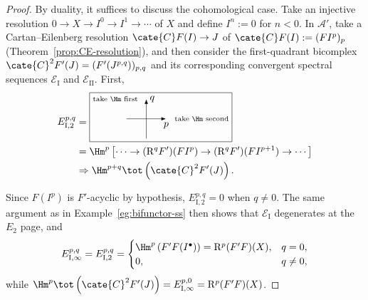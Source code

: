 \begin{proof}
	By duality, it suffices to discuss the cohomological case. Take an injective
	resolution $0\to X\to I^0\to I^1\to\cdots$ of $X$ and define $I^n:=0$ for
	$n<0$. In $\mathcal{A}'$, take a Cartan--Eilenberg resolution
	$\cate{C}F(I)\to J$ of $\cate{C}F(I):=(FI^p)_p$
	(Theorem~\ref{prop:CE-resolution}), and then consider the first-quadrant
	bicomplex $\cate{C}^2F'(J)=(F'(J^{p,q}))_{p,q}$ and its corresponding
	convergent spectral sequences $\mathscr{E}_{\mathrm{I}}$ and
	$\mathscr{E}_{\mathrm{II}}$. First,
	\begin{align*}
		E_{\mathrm{I},2}^{p, q} & =
		\begin{tikzpicture}[scale=0.7, baseline=(O)]
			\draw[-Latex] (0, -1) -- (0, 1) node[right] {$q$} node[left=0.5em] {\scriptsize\text{take $\Hm$ first}};
			\draw[-Latex] (-1, 0) -- (1, 0) node[below] {$p$} node[right=0.5em] {\scriptsize\text{take $\Hm$ second}};
			\coordinate (O) at (0, -0.3);
			\draw (current bounding box.north west) rectangle ([yshift=-1ex] current bounding box.south east);
		\end{tikzpicture} \\
		& = \Hm^p\left[ \cdots \to (\mathrm{R}^q F')(FI^p) \to (\mathrm{R}^q F')(FI^{p+1}) \to \cdots \right] \\
		& \Rightarrow \Hm^{p+q}\tot\left(\cate{C}^2 F'(J)\right).
	\end{align*}

	Since $F(I^p)$ is $F'$-acyclic by hypothesis,
	$E_{\mathrm{I},2}^{p,q}=0$ when $q\neq0$. The same argument as in
	Example~\ref{eg:bifunctor-ss} then shows that
	$\mathscr{E}_{\mathrm{I}}$ degenerates at the $E_2$ page, and
	\[ E_{\mathrm{I}, \infty}^{p,q} = E_{\mathrm{I}, 2}^{p,q} = \begin{cases}
		\Hm^p\left( F'F(I^\bullet) \right) = \mathrm{R}^p (F' F)(X), & q = 0, \\
		0, & q \neq 0,
	\end{cases}\]
	while
	$\Hm^p\tot\left(\cate{C}^2F'(J)\right)
	=E_{\mathrm{I},\infty}^{p,0}=\mathrm{R}^p(F'F)(X)$.


\end{proof}
